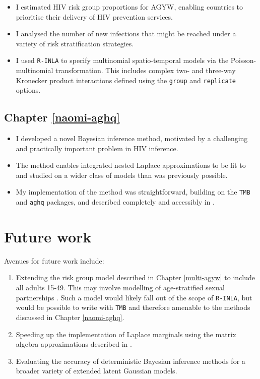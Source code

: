 \documentclass[a4paper, nobind]{templates/ociamthesis}
\providecommand{\tightlist}{%
  \setlength{\itemsep}{0pt}\setlength{\parskip}{0pt}}
\begin{document}
\begin{itemize}
\tightlist
\item
  I estimated HIV risk group proportions for AGYW, enabling countries to prioritise their delivery of HIV prevention services.
\item
  I analysed the number of new infections that might be reached under a variety of risk stratification strategies.
\item
  I used \texttt{R-INLA} to specify multinomial spatio-temporal models via the Poisson-multinomial transformation. This includes complex two- and three-way Kronecker product interactions defined using the \texttt{group} and \texttt{replicate} options.
\end{itemize}

\hypertarget{chapter-refnaomi-aghq}{%
\subsection{Chapter \ref{naomi-aghq}}\label{chapter-refnaomi-aghq}}

\begin{itemize}
\tightlist
\item
  I developed a novel Bayesian inference method, motivated by a challenging and practically important problem in HIV inference.
\item
  The method enables integrated nested Laplace approximations to be fit to and studied on a wider class of models than was previously possible.
\item
  My implementation of the method was straightforward, building on the \texttt{TMB} and \texttt{aghq} packages, and described completely and accessibly in \textcite{howes2023fast}.
\end{itemize}

\hypertarget{future-work}{%
\section{Future work}\label{future-work}}

Avenues for future work include:

\begin{enumerate}
\def\labelenumi{\arabic{enumi}.}
\tightlist
\item
  Extending the risk group model described in Chapter \ref{multi-agyw} to include all adults 15-49. This may involve modelling of age-stratified sexual partnerships \autocite{wolock2021evaluating}.
  Such a model would likely fall out of the scope of \texttt{R-INLA}, but would be possible to write with \texttt{TMB} and therefore amenable to the methods discussed in Chapter \ref{naomi-aghq}.
\item
  Speeding up the implementation of Laplace marginals using the matrix algebra approximations described in \textcite{wood2020simplified}.
\item
  Evaluating the accuracy of deterministic Bayesian inference methods for a broader variety of extended latent Gaussian models.
\end{enumerate}
\end{document}
